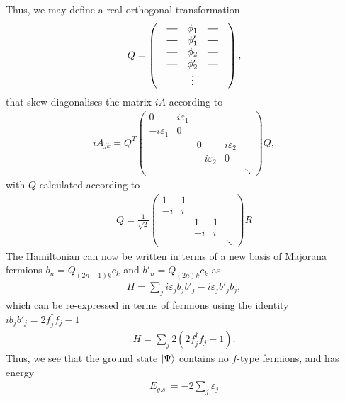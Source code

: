 Thus, we may define a real orthogonal transformation 
\begin{align}
    Q = \begin{pmatrix} 
        & \horzbar & \phi_1 & \horzbar & \\
        & \horzbar & \phi_1' & \horzbar & \\ 
        & \horzbar & \phi_2 & \horzbar & \\ 
        & \horzbar & \phi_2' & \horzbar & \\
        &  & \vdots & & 
    \end{pmatrix},
\end{align}
that skew-diagonalises the matrix $iA$ according to
\begin{align}
    iA_{jk} = Q^T
    \begin{pmatrix}
        0& i\varepsilon_1  &  &  & \\ 
        -i \varepsilon_1 & 0 &  &  & \\ 
        &  & 0 & i\varepsilon_2 & \\ 
        &  & -i\varepsilon_2 & 0 & \\ 
        &  &  &  & \ddots 
    \end{pmatrix}
    Q,
\end{align}
with $Q$ calculated according to
\begin{align} \label{eqn:r_to_q}
    Q = 
    \frac{1}{\sqrt 2}
    \begin{pmatrix}
        1  & 1  &  &  & \\ 
        -i & i &  &  & \\ 
        &  & 1  & 1 & \\ 
        &  & -i & i & \\ 
        &  &  &  & \ddots 
    \end{pmatrix}
    R
\end{align}
The Hamiltonian can now be written in terms of a new basis of Majorana fermions $b_{n} = Q_{(2n-1)k}c_k$ and $b'_{n} = Q_{(2n)k}c_k$ as 
\begin{align}
    H = \sum_{j} i \varepsilon_j b_j b'_j - i \varepsilon_j b'_j b_j,
\end{align}
which can be re-expressed in terms of fermions using the identity $i b_j b'_j = 2 f^\dag _j f_j -1$
\begin{align} \label{eqn:fermion_ham}
    H = \sum_{j} 2 \left (2 f^\dag _j f_j -1 \right ).
\end{align}
Thus, we see that the ground state $\ket{\Psi}$ contains no $f$-type fermions, and has energy 
\begin{align}
    E_{g.s.} = -2\sum_{j} \varepsilon_j
\end{align}

